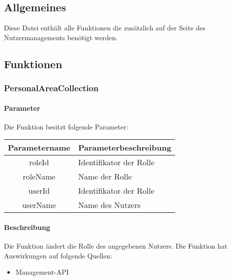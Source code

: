 \subsection{Allgemeines} Diese Datei enthält alle Funktionen die zusätzlich auf der Seite des Nutzermanagements benötigt werden.
\subsection{Funktionen}
\subsubsection{PersonalAreaCollection}
\paragraph{Parameter} Die Funktion besitzt folgende Parameter:
\begin{table}[H]
	\begin{tabular}{|c|p{11cm}|}
		\hline
		\textbf{Parametername} & \textbf{Parameterbeschreibung} \\ \hline
		roleId   & Identifikator der Rolle \\ \hline
		roleName & Name der Rolle \\ \hline
		userId   & Identifikator der Rolle \\ \hline
		userName & Name des Nutzers \\ \hline
	\end{tabular}
\end{table}
\paragraph{Beschreibung} Die Funktion ändert die Rolle des angegebenen Nutzers. Die Funktion hat Auswirkungen auf folgende Quellen:
\begin{itemize}
	\item Management-API
\end{itemize}

